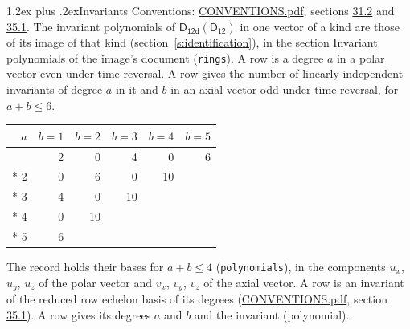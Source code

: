 \documentclass[10pt,a4paper]{article}
\makeatletter
\renewcommand\section{\@startsection{section}{1}{\z@}{-3ex plus -1ex minus -.2ex}%
  {1.2ex plus .2ex}{\normalfont\large\sffamily\bfseries\color{parttitle}}}
\numberwithin{equation}{section}
\newcommand{\grp}[1]{\mathsf{#1}}
\makeatother
\begin{document}
\section{Invariants}\label{s:invariants}
Conventions: \href{../../CONVENTIONS.pdf}{CONVENTIONS.pdf}, sections \href{../../CONVENTIONS.pdf\#conv.31.2}{31.2} and \href{../../CONVENTIONS.pdf\#conv.35.1}{35.1}.
The invariant polynomials of $\grp{D_{12d}}(\grp{D_{12}})$ in one vector of a kind are those of its image of that kind (section~\ref{s:identification}), in the section Invariant polynomials of the image's document (\texttt{rings}).
\leavevmode\label{n:index.degree.polar}\label{n:index.degree.axial}A row is a degree $a$ in a polar vector even under time reversal. A row gives the number of linearly independent invariants of degree $a$ in it and $b$ in an axial vector odd under time reversal, for $a + b \le 6$.
{\small\begin{longtable}{@{}rrrrrr@{}}\toprule
$a$ & $b = 1$ & $b = 2$ & $b = 3$ & $b = 4$ & $b = 5$\\\midrule\endhead
\bottomrule\endfoot\endlastfoot
1 & 2 & 0 & 4 & 0 & 6\\*
2 & 0 & 6 & 0 & 10 & \\*
3 & 4 & 0 & 10 &  & \\*
4 & 0 & 10 &  &  & \\*
5 & 6 &  &  &  & \\
\bottomrule\end{longtable}}
\leavevmode\label{n:local.component.polar}\label{n:local.component.axial}The record holds their bases for $a + b \le 4$ (\texttt{polynomials}), in the components $u_{x}$, $u_{y}$, $u_{z}$ of the polar vector and $v_{x}$, $v_{y}$, $v_{z}$ of the axial vector. \label{n:head.polynomial}A row is an invariant of the reduced row echelon basis of its degrees (\href{../../CONVENTIONS.pdf}{CONVENTIONS.pdf}, section \href{../../CONVENTIONS.pdf\#conv.35.1}{35.1}). A row gives its degrees $a$ and $b$ and the invariant (polynomial).
\end{document}
